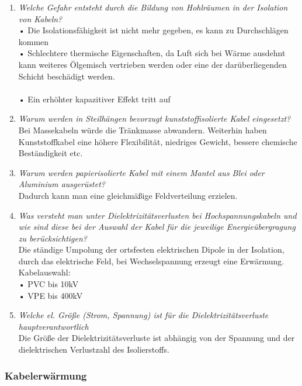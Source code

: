 \documentclass[12pt]{article}
\begin{document}
\begin{enumerate}
    \item \textit{Welche Gefahr entsteht durch die Bildung von 
    Hohlräumen in der Isolation von Kabeln?}\\
    • Die Isolationsfähigkeit ist nicht mehr gegeben, es kann zu Durchschlägen kommen \\
    • Schlechtere thermische Eigenschaften, da Luft sich bei 
    Wärme ausdehnt kann weiteres Ölgemisch vertrieben werden oder eine der darüberliegenden Schicht beschädigt werden.\\
    \\• Ein erhöhter kapazitiver Effekt tritt auf
    \item \textit{Warum werden in Steilhängen bevorzugt 
    kunststoffisolierte Kabel eingesetzt?}\\
    Bei Massekabeln würde die Tränkmasse abwandern. Weiterhin haben Kunststoffkabel eine höhere Flexibilität, niedriges Gewicht, bessere chemische Beständigkeit etc.
    \item \textit{Warum werden papierisolierte Kabel mit einem 
    Mantel aus Blei oder Aluminium ausgerüstet?}\\
    Dadurch kann man eine gleichmäßige Feldverteilung erzielen.
    \item \textit{Was versteht man unter Dielektrizitätsverlusten bei 
    Hochspannungskabeln und wie sind diese bei der 
    Auswahl der Kabel für die jeweilige 
    Energieübergragung zu berücksichtigen? }\\
    Die ständige Umpolung der ortsfesten elektrischen Dipole in der Isolation, durch das elektrische Feld, 
    bei Wechselspannung erzeugt eine Erwärmung. \\
    Kabelauswahl: \\
    • PVC bis 10kV \\
    • VPE bis 400kV \\
    \item \textit{Welche el. Größe (Strom, Spannung) ist für die 
    Dielektrizitätsverluste hauptverantwortlich}\\
    Die Größe der Dielektrizitätsverluste ist abhängig von der Spannung und der dielektrischen 
    Verlustzahl des Isolierstoffs.
\end{enumerate}




\subsubsection{Kabelerwärmung}
\end{document}
